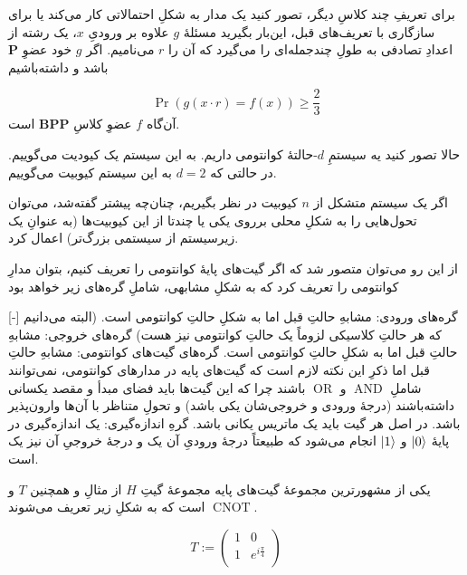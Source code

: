 \documentclass[a4paper,12pt]{article}
\DeclareMathOperator{\AND}{AND}
\DeclareMathOperator{\OR}{OR}
\DeclareMathOperator{\CNOT}{CNOT}
\begin{document}
برای تعریفِ چند کلاسِ دیگر، تصور کنید یک مدار به شکلِ احتمالاتی کار می‌کند یا برای سازگاری با تعریف‌های قبل، این‌بار بگیرید مسئلهٔ \(g\) علاوه بر ورودیِ \(x\)، یک رشته از اعدادِ تصادفی به طولِ چندجمله‌ای را می‌گیرد که آن را \(r\) می‌نامیم. اگر \(g\) خود عضوِ 
\( \mathbf{P} \) 
باشد و داشته‌باشیم

\begin{equation}
    \Pr(g(x \cdot r) = f(x)) \ge \frac{2}{3}
\end{equation} 
آن‌گاه \(f\) عضوِ کلاسِ 
\( \mathbf{BPP} \)
است. 
 
 
حالا تصور کنید یه سیستمِ \(d\)-حالتهٔ 
کوانتومی داریم. به این سیستم یک کیودیت می‌گوییم. در حالتی که 
\(d=2\)
به این سیستم کیوبیت می‌گوییم.

اگر یک سیستم متشکل از \(n\) کیوبیت در نظر بگیریم، چنان‌چه پیشتر گفته‌شد، می‌توان تحول‌هایی را به شکلِ محلی برروی یکی یا چندتا از این کیوبیت‌ها (به عنوانِ یک زیرسیستم از سیستمی بزرگ‌تر) اعمال کرد.

از این رو می‌توان متصور شد که اگر گیت‌های پایهٔ کوانتومی را تعریف کنیم، بتوان مدارِ کوانتومی را تعریف کرد که به شکلِ مشابهی، شاملِ گره‌های زیر خواهد بود 

[-]
 گره‌های ورودی: مشابهِ حالتِ قبل اما به شکلِ حالتِ کوانتومی است. (البته می‌دانیم که هر حالتِ کلاسیکی لزوماً یک حالتِ کوانتومی نیز هست)
 گره‌های خروجی: مشابهِ حالتِ قبل اما به شکلِ حالتِ کوانتومی است.
 گره‌های گیت‌های کوانتومی: مشابهِ حالتِ قبل اما ذکرِ این نکته لازم است که گیت‌های پایه در مدارهای کوانتومی، نمی‌توانند شاملِ
\(\AND\)
و
\(\OR\)
باشند چرا که این گیت‌ها باید فضای مبدأ و مقصد یکسانی داشته‌باشند (درجهٔ ورودی و خروجی‌شان یکی باشد) و تحولِ متناظر با آن‌ها وارون‌پذیر باشد. در اصل هر گیت باید یک ماتریس یکانی باشد.
 گرهِ اندازه‌گیری: یک اندازه‌گیری در پایهٔ 
\( \ket{0} \)
و 
\( \ket{1} \)
انجام می‌شود که طبیعتاً درجهٔ ورودیِ آن یک و درجهٔ خروجیِ آن نیز یک است.


یکی از مشهورترین مجموعهٔ گیت‌های پایه مجموعهٔ گیتِ \(H\) از مثالِ  و همچنین \(T\) و \(\CNOT\)
است که به شکلِ زیر تعریف می‌شوند. 

\begin{equation}
    T := \begin{pmatrix}
        1 & 0 \\
        1 & e^{i\frac{\pi}{4}} \\
    \end{pmatrix}
\end{equation}
\end{document}
